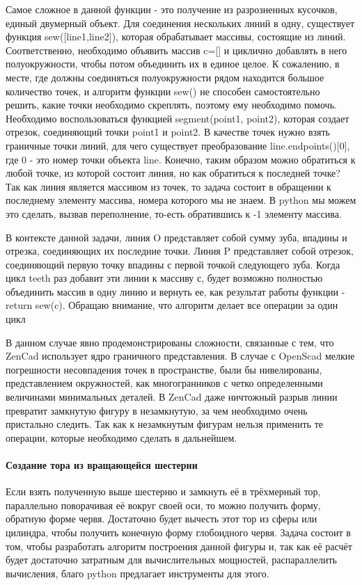 Самое сложное в данной функции - это получение из разрозненных кусочков, единый двумерный объект. Для соединения нескольких линий в одну, существует функция sew([line1,line2]), которая обрабатывает массивы, состоящие из линий. Соответственно, необходимо объявить массив c=[] и циклично добавлять в него полуокружности, чтобы потом объединить их в единое целое. К сожалению, в месте, где должны соединяться полуокружности рядом находится большое количество точек, и алгоритм функции sew() не способен самостоятельно решить, какие точки необходимо скреплять, поэтому ему необходимо помочь. Необходимо воспользоваться функцией segment(point1, point2), которая создает отрезок, соединяющий точки point1 и point2. В качестве точек нужно взять граничные точки линий, для чего существует преобразование line.endpoints()[0], где 0 - это номер точки объекта line. Конечно, таким образом можно обратиться к любой точке, из которой состоит линия, но как обратиться к последней точке? Так как линия является массивом из точек, то задача состоит в обращении к последнему элементу массива, номера которого мы не знаем. В python мы можем это сделать, вызвав переполнение, то-есть обратившись к -1 элементу массива.

В контексте данной задачи, линия O представляет собой сумму зуба, впадины и отрезка, соединяющих их последние точки. Линия P представляет собой отрезок, соединяющий первую точку впадины с первой точкой следующего зуба. Когда цикл teeth раз добавит эти линии к массиву с, будет возможно полностью объединить массив в одну линию и вернуть ее, как результат работы функции - return sew(c). Обращаю внимание, что алгоритм делает все операции за один цикл 

В данном случае явно продемонстрированы сложности, связанные с тем, что ZenCad использует ядро граничного представления. В случае с OpenScad мелкие погрешности несовпадения точек в пространстве, были бы нивелированы, представлением окружностей, как многогранников с четко определенными величинами минимальных деталей. В ZenCad даже ничтожный разрыв линии превратит замкнутую фигуру в незамкнутую, за чем необходимо очень пристально следить. Так как к незамкнутым фигурам нельзя применить те операции, которые необходимо сделать в дальнейшем.

\paragraph{Создание тора из вращающейся шестерни}  Если взять полученную выше шестерню и замкнуть её в трёхмерный тор, параллельно поворачивая её вокруг своей оси, то можно получить форму, обратную форме червя. Достаточно будет вычесть этот тор из сферы или цилиндра, чтобы получить конечную форму глобоидного червя. Задача состоит в том, чтобы разработать алгоритм построения данной фигуры и, так как её расчёт будет достаточно затратным для вычислительных мощностей, распараллелить вычисления, благо python предлагает инструменты для этого. 

